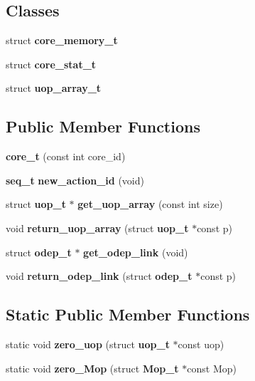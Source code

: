 \subsection*{Classes}
\begin{CompactItemize}
\item 
struct {\bf core\_\-memory\_\-t}
\item 
struct {\bf core\_\-stat\_\-t}
\item 
struct {\bf uop\_\-array\_\-t}
\end{CompactItemize}
\subsection*{Public Member Functions}
\begin{CompactItemize}
\item 
{\bf core\_\-t} (const int core\_\-id)
\item 
{\bf seq\_\-t} {\bf new\_\-action\_\-id} (void)
\item 
struct {\bf uop\_\-t} $\ast$ {\bf get\_\-uop\_\-array} (const int size)
\item 
void {\bf return\_\-uop\_\-array} (struct {\bf uop\_\-t} $\ast$const p)
\item 
struct {\bf odep\_\-t} $\ast$ {\bf get\_\-odep\_\-link} (void)
\item 
void {\bf return\_\-odep\_\-link} (struct {\bf odep\_\-t} $\ast$const p)
\end{CompactItemize}
\subsection*{Static Public Member Functions}
\begin{CompactItemize}
\item 
static void {\bf zero\_\-uop} (struct {\bf uop\_\-t} $\ast$const uop)
\item 
static void {\bf zero\_\-Mop} (struct {\bf Mop\_\-t} $\ast$const Mop)
\end{CompactItemize}
